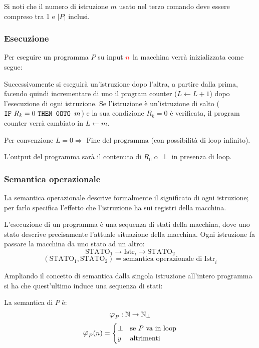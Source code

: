 Si noti che il numero di istruzione $m$ usato nel terzo comando deve essere compreso tra
1 e $|P|$ inclusi.

\subsubsection*{Esecuzione}
Per eseguire un programma $P$ su input $\color{red}n$ la macchina verrà inizializzata come segue:
\begin{figure}[H]
    \centering
    
\end{figure}

Successivamente si eseguirà un'istruzione dopo l'altra, a partire dalla prima, facendo quindi
incrementare di uno il program counter ($L\leftarrow L+1$) dopo l'esecuzione di ogni istruzione.
Se l'istruzione è un'istruzione di salto ($\texttt{IF}\text{ $R_k=0$ }\texttt{THEN GOTO }\text{$m$}$) e la sua condizione $R_k=0$
è verificata, il program counter verrà cambiato in $L\leftarrow m$.

Per convenzione $L=0 \Rightarrow \text{ Fine del programma}$ (con possibilità di loop infinito).

L'output del programma sarà il contenuto di $R_0$ o $\perp$ in presenza di loop.

\subsubsection*{Semantica operazionale}
La semantica operazionale descrive formalmente il significato di ogni istruzione; per farlo
specifica l'effetto che l'istruzione ha sui registri della macchina.

L'esecuzione di un programma è una sequenza di stati della macchina, dove uno stato descrive
precisamente l'attuale situazione della macchina. Ogni istruzione fa passare la macchina da
uno stato ad un altro:
$$ \text{STATO}_1 \rightarrow \boxed{\text{Istr}_i} \rightarrow \text{STATO}_2 $$
$$ (\text{STATO}_1,\text{STATO}_2) = \text{semantica operazionale di Istr}_i $$

Ampliando il concetto di semantica dalla singola istruzione all'intero programma si ha che 
quest'ultimo induce una sequenza di stati:
\begin{figure}[H]
    \centering
    
\end{figure}

La semantica di $P$ è:
$$ \semanticaRAM_P:\N\to\N_\perp $$
$$ \semanticaRAM_P(n) = \begin{cases}
\perp & \text{se $P$ va in loop}\\
y & \text{altrimenti}
\end{cases} $$

